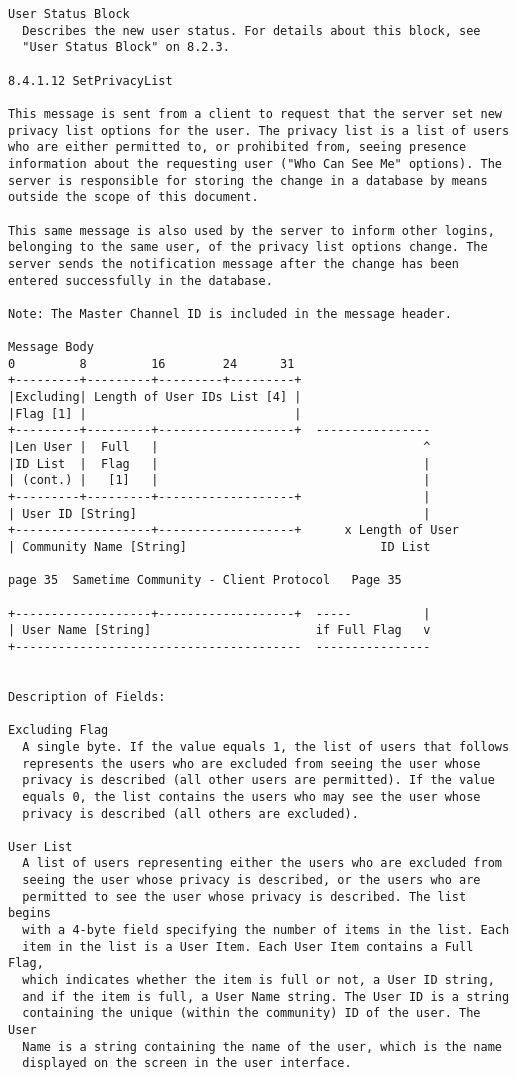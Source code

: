 \documentclass[titlepage,oneside]{book}
\begin{document}
\begin{verbatim}
User Status Block
  Describes the new user status. For details about this block, see
  "User Status Block" on 8.2.3.

8.4.1.12 SetPrivacyList

This message is sent from a client to request that the server set new
privacy list options for the user. The privacy list is a list of users
who are either permitted to, or prohibited from, seeing presence
information about the requesting user ("Who Can See Me" options). The
server is responsible for storing the change in a database by means
outside the scope of this document.

This same message is also used by the server to inform other logins,
belonging to the same user, of the privacy list options change. The
server sends the notification message after the change has been
entered successfully in the database.

Note: The Master Channel ID is included in the message header.

Message Body
0         8         16        24      31
+---------+---------+---------+---------+
|Excluding| Length of User IDs List [4] |
|Flag [1] |                             |
+---------+---------+-------------------+  ----------------
|Len User |  Full   |                                     ^
|ID List  |  Flag   |                                     |
| (cont.) |   [1]   |                                     |
+---------+---------+-------------------+                 |
| User ID [String]                                        |
+-------------------+-------------------+      x Length of User
| Community Name [String]                           ID List

page 35  Sametime Community - Client Protocol   Page 35

+-------------------+-------------------+  -----          |
| User Name [String]                       if Full Flag   v
+----------------------------------------  ----------------


Description of Fields:

Excluding Flag
  A single byte. If the value equals 1, the list of users that follows
  represents the users who are excluded from seeing the user whose
  privacy is described (all other users are permitted). If the value
  equals 0, the list contains the users who may see the user whose
  privacy is described (all others are excluded).

User List
  A list of users representing either the users who are excluded from
  seeing the user whose privacy is described, or the users who are
  permitted to see the user whose privacy is described. The list begins
  with a 4-byte field specifying the number of items in the list. Each
  item in the list is a User Item. Each User Item contains a Full Flag,
  which indicates whether the item is full or not, a User ID string,
  and if the item is full, a User Name string. The User ID is a string
  containing the unique (within the community) ID of the user. The User
  Name is a string containing the name of the user, which is the name
  displayed on the screen in the user interface.



\end{verbatim}
\end{document}
